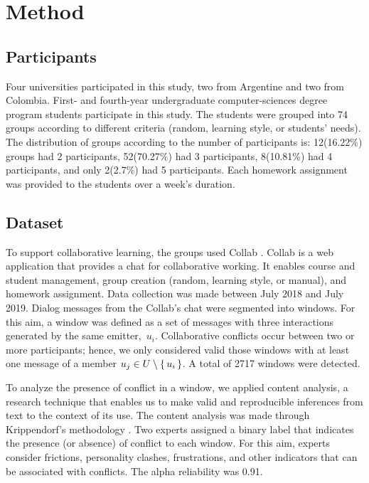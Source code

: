 \documentclass[3p,times,preprint]{elsarticle}
\begin{document}
\section{Method} \label{sec:methodology}

\subsection{Participants} Four universities participated in this study, two from Argentine and two from Colombia. First- and fourth-year undergraduate computer-sciences degree program students participate in this study. The students were grouped into 74 groups
according to different criteria (random, learning style, or students' needs). The distribution of groups according to the number of participants is: 12(16.22\%) groups had 2 participants,  52(70.27\%) had 3 participants, 8(10.81\%) had 4 participants, and only 2(2.7\%) had 5 participants. Each homework assignment was provided to the students over a week's duration.  

\subsection{Dataset} To support collaborative learning, the groups used Collab \citep{Lescano2018}. Collab is a web application that provides a chat for collaborative working. It enables course and student management, group creation (random, learning style, or manual), and homework assignment. Data collection was made between July 2018 and July 2019. Dialog messages from the Collab's chat were segmented into windows. For this aim, a window was defined as a set of messages with three interactions generated by the same \mbox{emitter, \textit{$u_i$}}. Collaborative conflicts occur between two or more participants; hence, we only considered valid those windows with at least one message of a member $u_j \in U \setminus \set{u_i}$. A total of 2717 windows were detected. 


To analyze the presence of conflict in a window, we applied content analysis, a research technique that enables us to make valid and reproducible inferences from text to the context of its use. The content analysis was made through Krippendorf's methodology \citep{Krippendorff2004}. %
Two experts assigned a binary label that indicates the presence (or absence) of conflict to each window. For this aim, experts consider frictions, personality clashes, frustrations, and other indicators that can be associated with conflicts. The alpha reliability was 0.91. 
\end{document}
